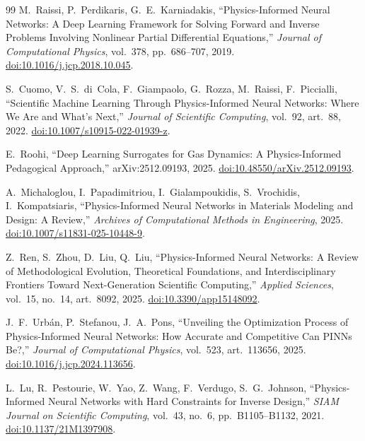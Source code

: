 \documentclass[11pt,a4paper]{report}
\begin{document}
\begin{thebibliography}{99}
M.~Raissi, P.~Perdikaris, G.~E.~Karniadakis, ``Physics-Informed Neural Networks: A Deep Learning Framework for Solving Forward and Inverse Problems Involving Nonlinear Partial Differential Equations,'' \textit{Journal of Computational Physics}, vol.~378, pp.~686--707, 2019.
\href{https://doi.org/10.1016/j.jcp.2018.10.045}{doi:10.1016/j.jcp.2018.10.045}.

S.~Cuomo, V.~S.~di~Cola, F.~Giampaolo, G.~Rozza, M.~Raissi, F.~Piccialli, ``Scientific Machine Learning Through Physics-Informed Neural Networks: Where We Are and What's Next,'' \textit{Journal of Scientific Computing}, vol.~92, art.~88, 2022.
\href{https://doi.org/10.1007/s10915-022-01939-z}{doi:10.1007/s10915-022-01939-z}.

E.~Roohi, ``Deep Learning Surrogates for Gas Dynamics: A Physics-Informed Pedagogical Approach,'' arXiv:2512.09193, 2025.
\href{https://doi.org/10.48550/arXiv.2512.09193}{doi:10.48550/arXiv.2512.09193}.

A.~Michaloglou, I.~Papadimitriou, I.~Gialampoukidis, S.~Vrochidis, I.~Kompatsiaris, ``Physics-Informed Neural Networks in Materials Modeling and Design: A Review,'' \textit{Archives of Computational Methods in Engineering}, 2025.
\href{https://doi.org/10.1007/s11831-025-10448-9}{doi:10.1007/s11831-025-10448-9}.

Z.~Ren, S.~Zhou, D.~Liu, Q.~Liu, ``Physics-Informed Neural Networks: A Review of Methodological Evolution, Theoretical Foundations, and Interdisciplinary Frontiers Toward Next-Generation Scientific Computing,'' \textit{Applied Sciences}, vol.~15, no.~14, art.~8092, 2025.
\href{https://doi.org/10.3390/app15148092}{doi:10.3390/app15148092}.

J.~F.~Urb\'an, P.~Stefanou, J.~A.~Pons, ``Unveiling the Optimization Process of Physics-Informed Neural Networks: How Accurate and Competitive Can PINNs Be?,'' \textit{Journal of Computational Physics}, vol.~523, art.~113656, 2025.
\href{https://doi.org/10.1016/j.jcp.2024.113656}{doi:10.1016/j.jcp.2024.113656}.

L.~Lu, R.~Pestourie, W.~Yao, Z.~Wang, F.~Verdugo, S.~G.~Johnson, ``Physics-Informed Neural Networks with Hard Constraints for Inverse Design,'' \textit{SIAM Journal on Scientific Computing}, vol.~43, no.~6, pp.~B1105--B1132, 2021.
\href{https://doi.org/10.1137/21M1397908}{doi:10.1137/21M1397908}.


\end{thebibliography}
\end{document}
